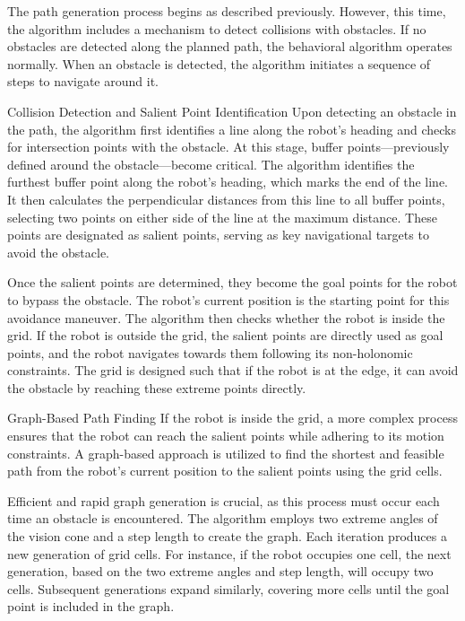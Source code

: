 \vspace*{6mm}  

The path generation process begins as described previously. However, this time, the algorithm includes a mechanism to detect collisions with obstacles. If no obstacles are detected along the planned path, the behavioral algorithm operates normally. When an obstacle is detected, the algorithm initiates a sequence of steps to navigate around it.

\vspace*{6mm}  

Collision Detection and Salient Point Identification
Upon detecting an obstacle in the path, the algorithm first identifies a line along the robot’s heading and checks for intersection points with the obstacle. At this stage, buffer points—previously defined around the obstacle—become critical. The algorithm identifies the furthest buffer point along the robot's heading, which marks the end of the line. It then calculates the perpendicular distances from this line to all buffer points, selecting two points on either side of the line at the maximum distance. These points are designated as salient points, serving as key navigational targets to avoid the obstacle.

\vspace*{6mm}  

Once the salient points are determined, they become the goal points for the robot to bypass the obstacle. The robot's current position is the starting point for this avoidance maneuver. The algorithm then checks whether the robot is inside the grid. If the robot is outside the grid, the salient points are directly used as goal points, and the robot navigates towards them following its non-holonomic constraints. The grid is designed such that if the robot is at the edge, it can avoid the obstacle by reaching these extreme points directly.

\vspace*{6mm}  

Graph-Based Path Finding
If the robot is inside the grid, a more complex process ensures that the robot can reach the salient points while adhering to its motion constraints. A graph-based approach is utilized to find the shortest and feasible path from the robot's current position to the salient points using the grid cells.

\vspace*{6mm}  

Efficient and rapid graph generation is crucial, as this process must occur each time an obstacle is encountered. The algorithm employs two extreme angles of the vision cone and a step length to create the graph. Each iteration produces a new generation of grid cells. For instance, if the robot occupies one cell, the next generation, based on the two extreme angles and step length, will occupy two cells. Subsequent generations expand similarly, covering more cells until the goal point is included in the graph.

